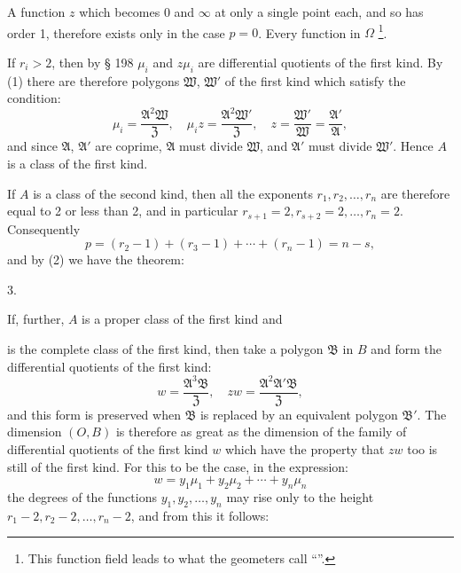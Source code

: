 A function $z$ which becomes 0 and $\infty$ at only a single point each,
and so has order 1, therefore exists only in the case $p = 0$.
Every function in $\Omega$ %
\footnote{This function field leads to what the geometers call
``''.}.

If $r_i > 2$, then by § 198 $\mu_i$ and $z\mu_i$ are differential
quotients of the first kind. By (1) there are therefore polygons $\mathfrak{W}$, $\mathfrak{W}'$
of the first kind which satisfy the condition:
\[
\mu_i = \frac{\mathfrak{A}^2\mathfrak{W}}{\mathfrak{Z}},\quad \mu_i z = \frac{\mathfrak{A}^2\mathfrak{W}'}{\mathfrak{Z}},\quad z = \frac{\mathfrak{W}'}{\mathfrak{W}} = \frac{\mathfrak{A}'}{\mathfrak{A}},
\]
and since $\mathfrak{A}$, $\mathfrak{A}'$ are coprime, $\mathfrak{A}$ must divide $\mathfrak{W}$, and $\mathfrak{A}'$ must divide $\mathfrak{W}'$.
Hence $A$ is a class of the first kind.

If $A$ is a class of the second kind, then all the exponents
$r_1, r_2, \ldots, r_n$ are therefore equal to 2 or less than 2, and in
particular $r_{s+1}=2, r_{s+2}=2, \ldots, r_n=2$. Consequently
\[
p = (r_2-1)+(r_3-1)+\cdots+(r_n-1) = n-s,
\]
and by (2) we have the theorem:

3. 


If, further, $A$ is a proper class of the first kind and


is the complete class of the first kind, then take a polygon $\mathfrak{B}$
in $B$ and form the differential quotients of the first kind:
\[
w = \frac{\mathfrak{A}^3\mathfrak{B}}{\mathfrak{Z}},\quad zw = \frac{\mathfrak{A}^2\mathfrak{A}'\mathfrak{B}}{\mathfrak{Z}},
\]
and this form is preserved when $\mathfrak{B}$ is replaced by an equivalent
polygon $\mathfrak{B}'$. The dimension $(O, B)$ is therefore as great
as the dimension of the family of differential quotients of the first
kind $w$ which have the property that $zw$ too is still of
the first kind. For this to be the case, in the
expression:
\[
w = y_1\mu_1 + y_2\mu_2 + \cdots + y_n\mu_n
\]
the degrees of the functions $y_1, y_2, \ldots, y_n$ may rise only to the height
$r_1-2, r_2-2, \ldots, r_n-2$, and from this it follows:
